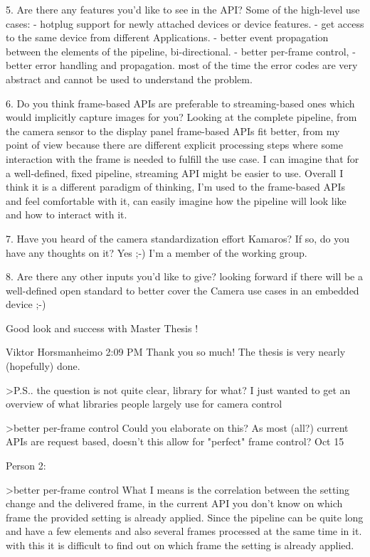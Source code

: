 5. Are there any features you’d like to see in the API?
Some of the high-level use cases:
 - hotplug support for newly attached devices or device features.
 - get access to the same device from different Applications.
 - better event propagation between the elements of the pipeline, bi-directional.
 - better per-frame control,
 - better error handling and propagation. most of the time the error codes are very abstract and cannot be used to understand the problem.

6. Do you think frame-based APIs are preferable to streaming-based ones which would implicitly capture images for you?
Looking at the complete pipeline, from the camera sensor to the display panel frame-based APIs fit better, from my point of view because there are different explicit processing steps where some interaction with the frame is needed to fulfill the use case. I can imagine that for a well-defined, fixed pipeline, streaming API might be easier to use.
Overall I think it is a different paradigm of thinking, I'm used to the frame-based APIs and feel comfortable with it, can easily imagine how the pipeline will look like and how to interact with it.

7. Have you heard of the camera standardization effort Kamaros? If so, do you have any thoughts on it?
Yes ;-) I'm a member of the working group.

8. Are there any other inputs you’d like to give?
looking forward if there will be a well-defined open standard to better cover the  Camera use cases in an embedded device ;-)

Good look and success with Master Thesis !

Viktor Horsmanheimo 2:09 PM
Thank you so much! The thesis is very nearly (hopefully) done.

>P.S.. the question is not quite clear, library for what?
I just wanted to get an overview of what libraries people largely use for camera control

>better per-frame control
Could you elaborate on this? As most (all?) current APIs are request based, doesn't this allow for "perfect" frame control?
Oct 15

Person 2:

>better per-frame control
What I means is the correlation between the setting change and the delivered frame, in the current API you don't know on which frame the provided setting is already applied. Since the pipeline can be quite long and have a few elements and also several frames processed at the same time in it. with this it is difficult to find out on which frame the setting is already applied.

